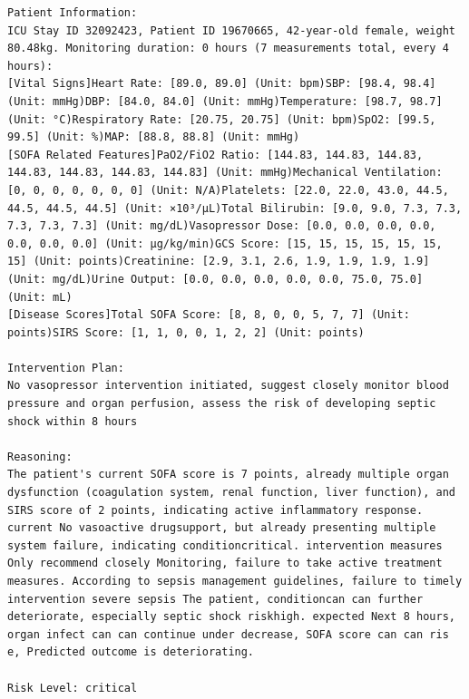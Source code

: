 \documentclass{article}
\begin{document}
\begin{lstlisting}[caption={Result for Patient 32092423}, label={lst:32092423}]
Patient Information:
ICU Stay ID 32092423, Patient ID 19670665, 42-year-old female, weight 80.48kg. Monitoring duration: 0 hours (7 measurements total, every 4 hours):
[Vital Signs]Heart Rate: [89.0, 89.0] (Unit: bpm)SBP: [98.4, 98.4] (Unit: mmHg)DBP: [84.0, 84.0] (Unit: mmHg)Temperature: [98.7, 98.7] (Unit: °C)Respiratory Rate: [20.75, 20.75] (Unit: bpm)SpO2: [99.5, 99.5] (Unit: %)MAP: [88.8, 88.8] (Unit: mmHg)
[SOFA Related Features]PaO2/FiO2 Ratio: [144.83, 144.83, 144.83, 144.83, 144.83, 144.83, 144.83] (Unit: mmHg)Mechanical Ventilation: [0, 0, 0, 0, 0, 0, 0] (Unit: N/A)Platelets: [22.0, 22.0, 43.0, 44.5, 44.5, 44.5, 44.5] (Unit: ×10³/μL)Total Bilirubin: [9.0, 9.0, 7.3, 7.3, 7.3, 7.3, 7.3] (Unit: mg/dL)Vasopressor Dose: [0.0, 0.0, 0.0, 0.0, 0.0, 0.0, 0.0] (Unit: μg/kg/min)GCS Score: [15, 15, 15, 15, 15, 15, 15] (Unit: points)Creatinine: [2.9, 3.1, 2.6, 1.9, 1.9, 1.9, 1.9] (Unit: mg/dL)Urine Output: [0.0, 0.0, 0.0, 0.0, 0.0, 75.0, 75.0] (Unit: mL)
[Disease Scores]Total SOFA Score: [8, 8, 0, 0, 5, 7, 7] (Unit: points)SIRS Score: [1, 1, 0, 0, 1, 2, 2] (Unit: points)

Intervention Plan:
No vasopressor intervention initiated, suggest closely monitor blood pressure and organ perfusion, assess the risk of developing septic shock within 8 hours

Reasoning:
The patient's current SOFA score is 7 points, already multiple organ dysfunction (coagulation system, renal function, liver function), and SIRS score of 2 points, indicating active inflammatory response. current No vasoactive drugsupport, but already presenting multiple system failure, indicating conditioncritical. intervention measures Only recommend closely Monitoring, failure to take active treatment measures. According to sepsis management guidelines, failure to timely intervention severe sepsis The patient, conditioncan can further deteriorate, especially septic shock riskhigh. expected Next 8 hours, organ infect can can continue under decrease, SOFA score can can ris e, Predicted outcome is deteriorating.

Risk Level: critical
\end{lstlisting}
\end{document}
